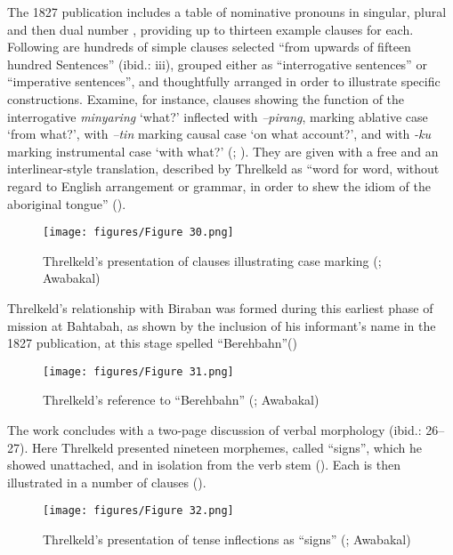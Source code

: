 The 1827 publication includes a table of nominative pronouns in singular, plural and then dual number \citep[4--8]{threlkeld_specimens_1927}, providing up to thirteen example clauses for each. Following are hundreds of simple clauses selected “from upwards of fifteen hundred Sentences” (ibid.: iii), grouped either as “interrogative sentences” or ``imperative sentences'', and thoughtfully arranged in order to illustrate specific constructions. Examine, for instance, clauses showing the function of the interrogative \textit{minyaring} `what?' inflected with \textit{–pirang}, marking ablative case `from what?', with \textit{–tin} marking causal case `on what account?', and with \textit{-ku} marking instrumental case `with what?' (\citealt[51]{lissarrague_salvage_2006}; ). They are given with a free and an interlinear-style translation, described by Threlkeld as “word for word, without regard to English arrangement or grammar, in order to shew the idiom of the aboriginal tongue” (\citealt[iii]{lissarrague_salvage_2006}).

\begin{figure}
\texttt{[image: figures/Figure 30.png]}
\caption{Threlkeld’s presentation of clauses illustrating case marking (\citeyear[10]{threlkeld_specimens_1927}; Awabakal)}
\label{fig:3:30}
\end{figure}

Threlkeld’s relationship with Biraban was formed during this earliest phase of mission at Bahtabah, as shown by the inclusion of his informant’s name in the 1827 publication, at this stage spelled “Berehbahn”()
\begin{figure}
\texttt{[image: figures/Figure 31.png]}
\caption{\label{fig:3:31} Threlkeld’s reference to “Berehbahn” (\citeyear[13]{threlkeld_specimens_1927}; Awabakal) }
\end{figure}


The work concludes with a two-page discussion of verbal morphology (ibid.: 26--27). Here Threlkeld presented nineteen morphemes, called ``signs'', which he showed unattached, and in isolation from the verb stem (). Each is then illustrated in a number of clauses ().
\begin{figure}
\texttt{[image: figures/Figure 32.png]}
\caption{\label{fig:3:32} Threlkeld’s presentation of tense inflections as “signs” (\citeyear[26]{threlkeld_specimens_1927}; Awabakal) }
\end{figure}


